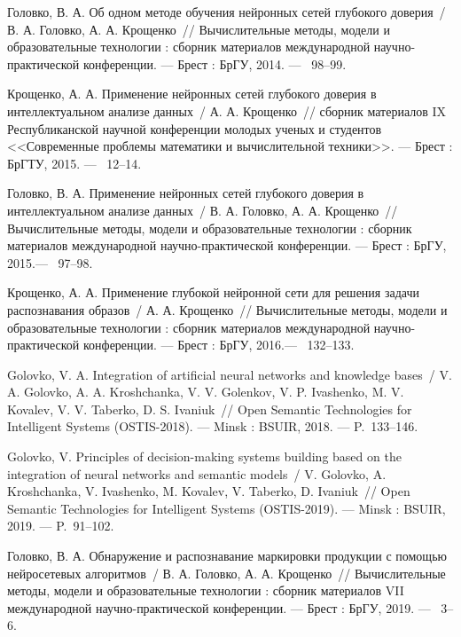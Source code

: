 Головко, В. А. Об одном методе обучения нейронных сетей глубокого доверия~/ В. А. Головко, А. А. Крощенко~// 
 Вычислительные методы, модели и образовательные технологии : сборник материалов международной научно-практической конференции. ---
\newblock Брест : БрГУ, 2014. ---
~98--99.

Крощенко, А. А. Применение нейронных сетей глубокого доверия в интеллектуальном анализе данных~/ А. А. Крощенко~// 
 сборник материалов IX Республиканской научной конференции молодых ученых и студентов <<Современные проблемы математики и вычислительной техники>>. ---
\newblock Брест : БрГТУ, 2015. ---
~12--14.

Головко, В. А.  Применение нейронных сетей глубокого доверия в интеллектуальном анализе данных~/ В. А. Головко, А. А. Крощенко~// 
 Вычислительные методы, модели и образовательные технологии : сборник материалов международной научно-практической конференции. ---
\newblock Брест : БрГУ, 2015.---
~97--98.

Крощенко, А. А. Применение глубокой нейронной сети для решения задачи распознавания образов~/ А. А. Крощенко~// 
 Вычислительные методы, модели и образовательные технологии : сборник материалов международной научно-практической конференции. ---
\newblock Брест : БрГУ, 2016.---
~132--133.

Golovko, V. A. Integration of artiﬁcial neural networks and knowledge bases~/ V. A. Golovko, A. A. Kroshchanka, V. V. Golenkov, V. P. Ivashenko, M. V. Kovalev, V. V. Taberko, D. S. Ivaniuk~// 
 Open Semantic Technologies for Intelligent Systems (OSTIS-2018). ---
\newblock Minsk : BSUIR, 2018. ---
\newblock P.~133--146.

Golovko, V. Principles of decision-making systems building based on the integration of neural networks and semantic models~/ V. Golovko, A. Kroshchanka, V. Ivashenko, M. Kovalev, V. Taberko, D. Ivaniuk~//
 Open Semantic Technologies for Intelligent Systems (OSTIS-2019). ---
\newblock Minsk : BSUIR, 2019. ---
\newblock P.~91--102.

Головко, В. А. Обнаружение и распознавание маркировки продукции с помощью нейросетевых алгоритмов~/ В. А. Головко, А. А. Крощенко~//
 Вычислительные методы, модели и образовательные технологии : сборник материалов VII международной научно-практической конференции. ---
\newblock Брест : БрГУ, 2019. ---
~3--6. 

